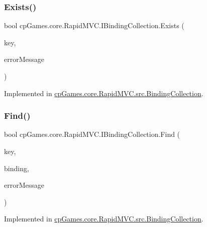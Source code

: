 \subsubsection{\texorpdfstring{Exists()}{Exists()}}
{\footnotesize\ttfamily bool cp\+Games.\+core.\+Rapid\+M\+V\+C.\+I\+Binding\+Collection.\+Exists (\begin{DoxyParamCaption}\item[{\mbox{\hyperlink{interfacecp_games_1_1core_1_1_rapid_m_v_c_1_1_i_binding_key}{I\+Binding\+Key}}}]{key,  }\item[{out string}]{error\+Message }\end{DoxyParamCaption})}



Implemented in \mbox{\hyperlink{classcp_games_1_1core_1_1_rapid_m_v_c_1_1src_1_1_binding_collection_ac8b4fb2a303f8c8755d36bf90d989453}{cp\+Games.\+core.\+Rapid\+M\+V\+C.\+src.\+Binding\+Collection}}.

\mbox{\label{interfacecp_games_1_1core_1_1_rapid_m_v_c_1_1_i_binding_collection_a7c6b93ad95ca21419be73882d1156458}} 
\subsubsection{\texorpdfstring{Find()}{Find()}}
{\footnotesize\ttfamily bool cp\+Games.\+core.\+Rapid\+M\+V\+C.\+I\+Binding\+Collection.\+Find (\begin{DoxyParamCaption}\item[{\mbox{\hyperlink{interfacecp_games_1_1core_1_1_rapid_m_v_c_1_1_i_binding_key}{I\+Binding\+Key}}}]{key,  }\item[{out \mbox{\hyperlink{interfacecp_games_1_1core_1_1_rapid_m_v_c_1_1_i_binding}{I\+Binding}}}]{binding,  }\item[{out string}]{error\+Message }\end{DoxyParamCaption})}



Implemented in \mbox{\hyperlink{classcp_games_1_1core_1_1_rapid_m_v_c_1_1src_1_1_binding_collection_a7d08f6f549f95ec651486e5295f985c8}{cp\+Games.\+core.\+Rapid\+M\+V\+C.\+src.\+Binding\+Collection}}.

\mbox{\label{interfacecp_games_1_1core_1_1_rapid_m_v_c_1_1_i_binding_collection_ab20c12c64a91e24e7685780dd64f1d87}} 
